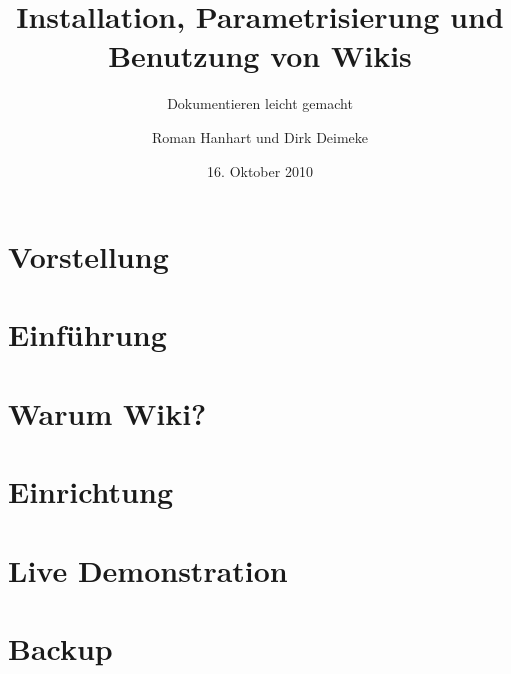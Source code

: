 \documentclass{beamer}
\title[Wikis]{Installation, Parametrisierung und Benutzung von Wikis}
\subtitle[Dokumentieren leicht gemacht]{Dokumentieren leicht gemacht}
\author[]{Roman Hanhart und Dirk Deimeke}
\institute{Ubucon 2010}
\date{16. Oktober 2010}
\begin{document}
\frame{\titlepage}

\section{Vorstellung} 



\section{Einführung}


\section{Warum Wiki?} 



\section{Einrichtung}



\section{Live Demonstration}


\section{Backup}


\end{document}
